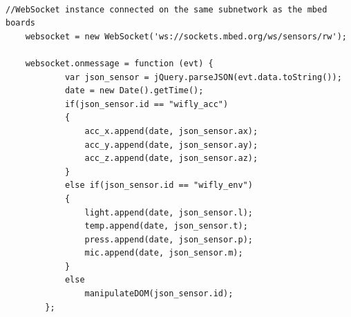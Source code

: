 \documentclass[pdftex,10pt,a4paper]{report}
\newenvironment{packed_item}{
\begin{itemize}
  \setlength{\itemsep}{1pt}
  \setlength{\parskip}{0pt}
  \setlength{\parsep}{0pt}
}{\end{itemize}}
\begin{document}
 \\


\begin{center}
\begin{lstlisting}[label=Manipulation of WebSocket messages by the dashboard,caption=Manipulation of WebSocket messages by the dashboard]
    //WebSocket instance connected on the same subnetwork as the mbed boards
    websocket = new WebSocket('ws://sockets.mbed.org/ws/sensors/rw');

    websocket.onmessage = function (evt) {
			var json_sensor = jQuery.parseJSON(evt.data.toString());
			date = new Date().getTime();
			if(json_sensor.id == "wifly_acc") 
			{
				acc_x.append(date, json_sensor.ax);
				acc_y.append(date, json_sensor.ay);
				acc_z.append(date, json_sensor.az);
			}
			else if(json_sensor.id == "wifly_env") 
			{
				light.append(date, json_sensor.l);
				temp.append(date, json_sensor.t);
				press.append(date, json_sensor.p);
				mic.append(date, json_sensor.m);
			}
			else
				manipulateDOM(json_sensor.id);
		};
	\end{lstlisting}
\end{center}
\end{document}
